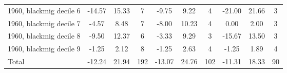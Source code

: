 \begin{table}[htbp]
\begin{tabular}{l*{3}{ccc}}
1960, blackmig decile 6&      -14.57&       15.33&           7&       -9.75&        9.22&           4&      -21.00&       21.66&           3\\
1960, blackmig decile 7&       -4.57&        8.48&           7&       -8.00&       10.23&           4&        0.00&        2.00&           3\\
1960, blackmig decile 8&       -9.50&       12.37&           6&       -3.33&        9.29&           3&      -15.67&       13.50&           3\\
1960, blackmig decile 9&       -1.25&        2.12&           8&       -1.25&        2.63&           4&       -1.25&        1.89&           4\\
Total               &      -12.24&       21.94&         192&      -13.07&       24.76&         102&      -11.31&       18.33&          90\\
\bottomrule
\end{tabular}
\end{table}

